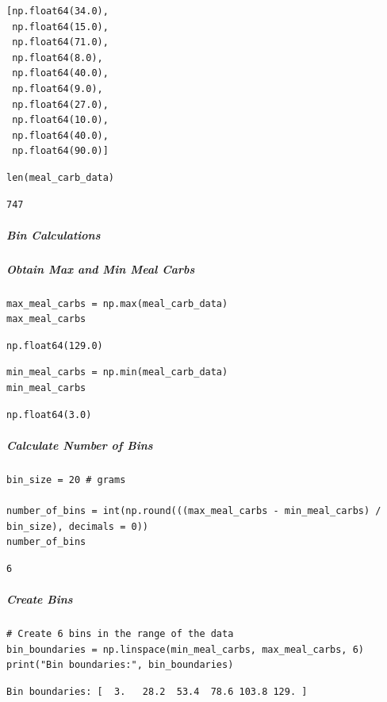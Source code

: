 \begin{verbatim}
[np.float64(34.0),
 np.float64(15.0),
 np.float64(71.0),
 np.float64(8.0),
 np.float64(40.0),
 np.float64(9.0),
 np.float64(27.0),
 np.float64(10.0),
 np.float64(40.0),
 np.float64(90.0)]
\end{verbatim}

\begin{verbatim}
len(meal_carb_data)
\end{verbatim}

\begin{verbatim}
747
\end{verbatim}

\subparagraph{Bin Calculations}

\subparagraph{Obtain Max and Min Meal Carbs}

\begin{verbatim}
max_meal_carbs = np.max(meal_carb_data)
max_meal_carbs
\end{verbatim}

\begin{verbatim}
np.float64(129.0)
\end{verbatim}

\begin{verbatim}
min_meal_carbs = np.min(meal_carb_data)
min_meal_carbs
\end{verbatim}

\begin{verbatim}
np.float64(3.0)
\end{verbatim}

\subparagraph{Calculate Number of Bins}

\begin{verbatim}
bin_size = 20 # grams

number_of_bins = int(np.round(((max_meal_carbs - min_meal_carbs) / bin_size), decimals = 0))
number_of_bins
\end{verbatim}

\begin{verbatim}
6
\end{verbatim}

\subparagraph{Create Bins}

\begin{verbatim}
# Create 6 bins in the range of the data
bin_boundaries = np.linspace(min_meal_carbs, max_meal_carbs, 6) 
print("Bin boundaries:", bin_boundaries)
\end{verbatim}

\begin{verbatim}
Bin boundaries: [  3.   28.2  53.4  78.6 103.8 129. ]
\end{verbatim}

